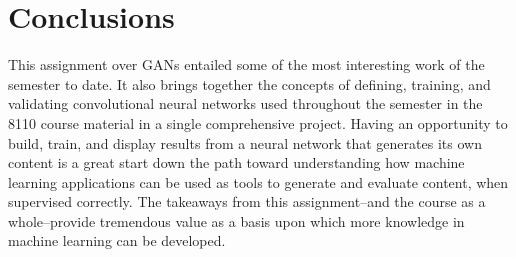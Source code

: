 \documentclass{article}
\begin{document}
\section{Conclusions}
\par This assignment over GANs entailed some of the most interesting work of the semester to date.
It also brings together the concepts of defining, training, and validating convolutional neural networks used throughout the semester in the 8110 course material in a single comprehensive project.
Having an opportunity to build, train, and display results from a neural network that generates its own content is a great start down the path toward understanding how machine learning applications can be used as tools to generate and evaluate content, when supervised correctly.
The takeaways from this assignment--and the course as a whole--provide tremendous value as a basis upon which more knowledge in machine learning can be developed.
% 
% 
\end{document}
